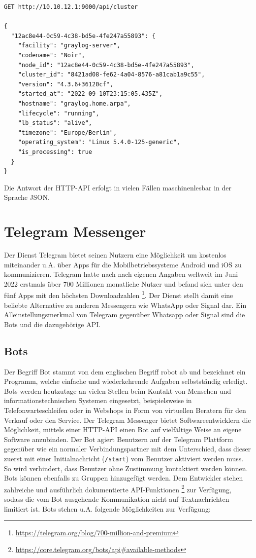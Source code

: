 \begin{lstlisting}[caption={Beispiel eines Aufrufs der Graylog REST-API.}, label=bsp-rest-api, xleftmargin=6mm]
GET http://10.10.12.1:9000/api/cluster

{
  "12ac8e44-0c59-4c38-bd5e-4fe247a55893": {
    "facility": "graylog-server",
    "codename": "Noir",
    "node_id": "12ac8e44-0c59-4c38-bd5e-4fe247a55893",
    "cluster_id": "8421ad08-fe62-4a04-8576-a81cab1a9c55",
    "version": "4.3.6+36120cf",
    "started_at": "2022-09-10T23:15:05.435Z",
    "hostname": "graylog.home.arpa",
    "lifecycle": "running",
    "lb_status": "alive",
    "timezone": "Europe/Berlin",
    "operating_system": "Linux 5.4.0-125-generic",
    "is_processing": true
  }
}
\end{lstlisting}

Die Antwort der HTTP-API erfolgt in vielen Fällen maschinenlesbar in der Sprache JSON.

\section{Telegram Messenger}

Der Dienst Telegram bietet seinen Nutzern eine Möglichkeit um kostenlos miteinander u.A. über Apps für die Mobilbetriebssysteme Android und iOS zu kommunizieren. Telegram hatte nach nach eigenen Angaben weltweit im Juni 2022 erstmals über 700 Millionen monatliche Nutzer und befand sich unter den fünf Apps mit den höchsten Downloadzahlen \footnote{\url{https://telegram.org/blog/700-million-and-premium}}. Der Dienst stellt damit eine beliebte Alternative zu anderen Messengern wie WhatsApp oder Signal dar. Ein Alleinstellungsmerkmal von Telegram gegenüber Whatsapp oder Signal sind die Bots und die dazugehörige API.

\subsection{Bots}

Der Begriff Bot stammt von dem englischen Begriff robot ab und bezeichnet ein Programm, welche einfache und wiederkehrende Aufgaben selbstständig erledigt. Bots werden heutzutage an vielen Stellen beim Kontakt von Menschen und informationstechnischen Systemen eingesetzt, beispielsweise in Telefonwarteschleifen oder in Webshops in Form von virtuellen Beratern für den Verkauf oder den Service. Der Telegram Messenger bietet Softwareentwicklern die Möglichkeit, mittels einer HTTP-API einen Bot auf vielfältige Weise an eigene Software anzubinden. Der Bot agiert Benutzern auf der Telegram Plattform gegenüber wie ein normaler Verbindungspartner mit dem Unterschied, dass dieser zuerst mit einer Initialnachricht (\lstinline{/start}) vom Benutzer aktiviert werden muss. So wird verhindert, dass  Benutzer ohne Zustimmung kontaktiert werden können. Bots können ebenfalls zu Gruppen hinzugefügt werden. Dem Entwickler stehen zahlreiche und ausführlich dokumentierte API-Funktionen \footnote{\url{https://core.telegram.org/bots/api\#available-methods}} zur Verfügung, sodass die vom Bot ausgehende Kommunikation nicht auf Textnachrichten limitiert ist. Bots stehen u.A. folgende Möglichkeiten zur Verfügung:

